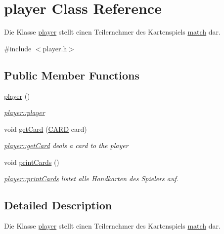 \hypertarget{classplayer}{\section{player Class Reference}
\label{classplayer}
}


Die Klasse \hyperlink{classplayer}{player} stellt einen Teilernehmer des Kartenspiels \hyperlink{classmatch}{match} dar.  




{\ttfamily \#include $<$player.\-h$>$}

\subsection*{Public Member Functions}
\begin{DoxyCompactItemize}
\item 
\hypertarget{classplayer_a97de83bce15f880241f561b55b016b02}{\hyperlink{classplayer_a97de83bce15f880241f561b55b016b02}{player} ()}\label{classplayer_a97de83bce15f880241f561b55b016b02}

\begin{DoxyCompactList}\small\item\em \hyperlink{classplayer_a97de83bce15f880241f561b55b016b02}{player\-::player} \end{DoxyCompactList}\item 
void \hyperlink{classplayer_a7ee9bffda2073c5ffa036fd978cea86d}{get\-Card} (\hyperlink{struct_c_a_r_d}{C\-A\-R\-D} card)
\begin{DoxyCompactList}\small\item\em \hyperlink{classplayer_a7ee9bffda2073c5ffa036fd978cea86d}{player\-::get\-Card} deals a card to the player \end{DoxyCompactList}\item 
\hypertarget{classplayer_a3dc68b6bb16cc8cb5d2a8bdbe9979bda}{void \hyperlink{classplayer_a3dc68b6bb16cc8cb5d2a8bdbe9979bda}{print\-Cards} ()}\label{classplayer_a3dc68b6bb16cc8cb5d2a8bdbe9979bda}

\begin{DoxyCompactList}\small\item\em \hyperlink{classplayer_a3dc68b6bb16cc8cb5d2a8bdbe9979bda}{player\-::print\-Cards} listet alle Handkarten des Spielers auf. \end{DoxyCompactList}\end{DoxyCompactItemize}


\subsection{Detailed Description}
Die Klasse \hyperlink{classplayer}{player} stellt einen Teilernehmer des Kartenspiels \hyperlink{classmatch}{match} dar. 

